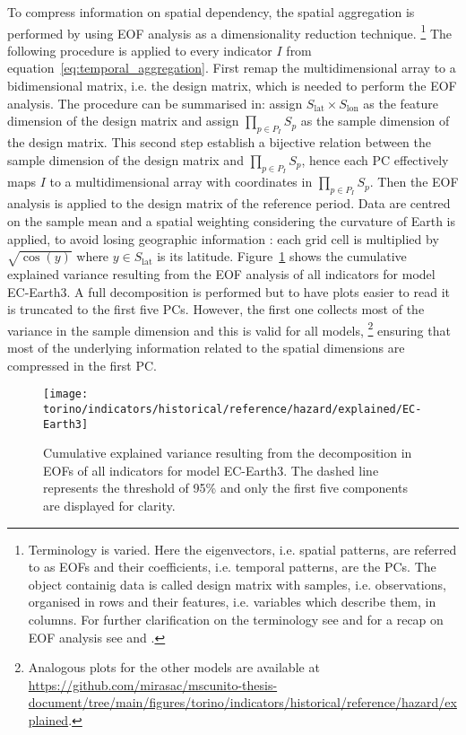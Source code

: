 To compress information on spatial dependency, the spatial aggregation is performed by using \gls{EOF} analysis as a dimensionality reduction technique.%
\footnote{Terminology is varied. Here the eigenvectors, i.e. spatial patterns, are referred to as \glspl{EOF} and their coefficients, i.e. temporal patterns, are the \glspl{PC}. The object containig data is called design matrix with samples, i.e. observations, organised in rows and their features, i.e. variables which describe them, in columns. For further clarification on the terminology see \cite[626-627]{2019WilksStatisticalMethods} and for a recap on \gls{EOF} analysis see \cite[6502-6503]{2009MonahanEmpiricalOrthogonal} and \cite[1121-1122]{2007HannachiEmpiricalOrthogonal}.}
The following procedure is applied to every \gls{indicator} $I$ from equation~\eqref{eq:temporal_aggregation}.
First remap the multidimensional array to a bidimensional matrix, i.e. the design matrix, which is needed to perform the \gls{EOF} analysis. The procedure can be summarised in: assign $S_\text{lat} \times S_\text{lon}$ as the feature dimension of the design matrix and assign $\prod_{p \in P_I} S_p$ as the sample dimension of the design matrix. This second step establish a bijective relation between the sample dimension of the design matrix and $\prod_{p \in P_I} S_p$, hence each \gls{PC} effectively maps $I$ to a multidimensional array with coordinates in $\prod_{p \in P_I} S_p$.
Then the \gls{EOF} analysis is applied to the design matrix of the reference period. Data are centred on the sample mean and a spatial weighting considering the curvature of Earth is applied, to avoid losing geographic information \cite{2009BaldwinSpatialWeighting}: each grid cell is multiplied by $\sqrt{\cos{(y)}}$ where $y \in S_\text{lat}$ is its latitude.
Figure~\ref{fig:explained_EC-Earth3} shows the cumulative explained variance resulting from the \gls{EOF} analysis of all indicators for model EC-Earth3. A full decomposition is performed but to have plots easier to read it is truncated to the first five \glspl{PC}. However, the first one collects most of the variance in the sample dimension and this is valid for all models,%
\footnote{Analogous plots for the other models are available at \url{https://github.com/mirasac/mscunito-thesis-document/tree/main/figures/torino/indicators/historical/reference/hazard/explained}.}
ensuring that most of the underlying information related to the spatial dimensions are compressed in the first \gls{PC}.

\begin{figure}[h]
  \centering
  \texttt{[image: torino/indicators/historical/reference/hazard/explained/EC-Earth3]}
  \caption{Cumulative explained variance resulting from the decomposition in \glspl{EOF} of all indicators for model EC-Earth3. The dashed line represents the threshold of 95\% and only the first five components are displayed for clarity.}
  \label{fig:explained_EC-Earth3}
\end{figure}

